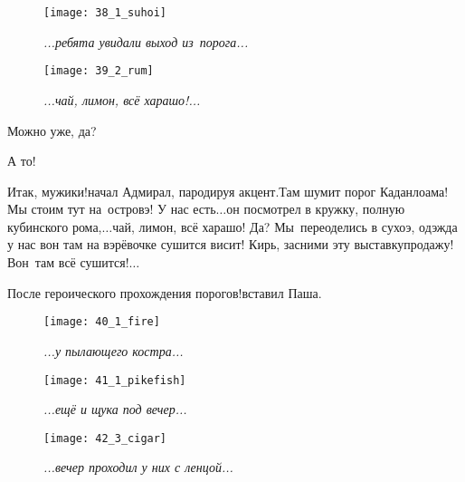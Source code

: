 \begin{figure}[h]
	\centering
	\texttt{[image: 38\_1\_suhoi]}
	\caption{\small\textit{...ребята увидали выход из~порога...}}
\end{figure}

\newpage

\begin{wrapfigure}[17]{r}{0.5\textwidth}
	\centering
	\texttt{[image: 39\_2\_rum]}
	\caption{\small\textit{...чай, лимон, всё харашо!...}}
\end{wrapfigure}
\diagdash Можно уже, да?

\diagdash А то!

\diagdash Итак, мужики!\mdash начал Адмирал, пародируя акцент.\mdash Там шумит порог Каданлоама! Мы стоим тут на~островэ! У нас есть$\ldots$\mdash он посмотрел в кружку, полную кубинского рома,\mdash $\ldots$чай, лимон, всё харашо! Да? Мы~переоделись в сухоэ, одэжда у нас вон там на вэрёвочке сушится висит! Кирь, засними эту выставку\sdash продажу! Вон~там всё сушится!$\ldots$


\diagdash После героического прохождения порогов!\mdash вставил Паша.

\newpage

\begin{figure}[h]
	\centering
	\texttt{[image: 40\_1\_fire]}
	\caption{\small\textit{...у пылающего костра...}}
\end{figure}


\newpage

\begin{figure}[h]
	\centering
	\texttt{[image: 41\_1\_pikefish]}
	\caption{\small\textit{...ещё и щука под вечер...}}
\end{figure}

\newpage

\begin{figure}[h]
	\centering
	\texttt{[image: 42\_3\_cigar]}
	\caption{\small\textit{...вечер проходил у них с ленцой...}}
\end{figure}

\newpage


